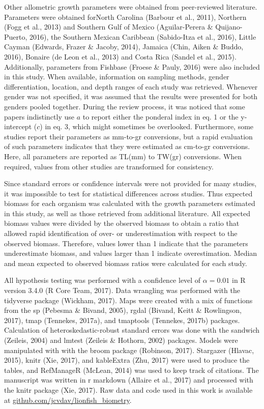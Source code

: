\documentclass[12pt,]{article}
\begin{document}
Other allometric growth parameters were obtained from peer-reviewed
literature. Parameters were obtained forNorth Carolina (Barbour et al.,
2011), Northern (Fogg et al., 2013) and Southern Gulf of Mexico
(Aguilar-Perera \& Quijano-Puerto, 2016), the Southern Mexican Caribbean
(Sabido-Itza et al., 2016), Little Cayman (Edwards, Frazer \& Jacoby,
2014), Jamaica (Chin, Aiken \& Buddo, 2016), Bonaire (de Leon et al.,
2013) and Costa Rica (Sandel et al., 2015). Additionally, parameters
from Fishbase (Froese \& Pauly, 2016) were also included in this study.
When available, information on sampling methods, gender differentiation,
location, and depth ranges of each study was retrieved. Whenever gender
was not specified, it was assumed that the results were presented for
both genders pooled together. During the review process, it was noticed
that some papers indistinctly use \(a\) to report either the ponderal
index in eq. 1 or the y-intercept (\(c\)) in eq. 3, which might
sometimes be overlooked. Furthermore, some studies report their
parameters as mm-to-gr conversions, but a rapid evaluation of such
parameters indicates that they were estimated as cm-to-gr conversions.
Here, all parameters are reported as TL(mm) to TW(gr) conversions. When
required, values from other studies are transformed for consistency.

Since standard errors or confidence intervals were not provided for many
studies, it was impossible to test for statistical differences across
studies. Thus expected biomass for each organism was calculated with the
growth parameters estimated in this study, as well as those retrieved
from additional literature. All expected biomass values were divided by
the observed biomass to obtain a ratio that allowed rapid identification
of over- or underestimation with respect to the observed biomass.
Therefore, values lower than 1 indicate that the parameters
underestimate biomass, and values larger than 1 indicate overestimation.
Median and mean expected to observed biomass ratios were calculated for
each study.

All hypothesis testing was performed with a confidence level of
\(\alpha = 0.01\) in R version 3.4.0 (R Core Team, 2017). Data wrangling
was performed with the tidyverse package (Wickham, 2017). Maps were
created with a mix of functions from the sp (Pebesma \& Bivand, 2005),
rgdal (Bivand, Keitt \& Rowlingson, 2017), tmap (Tennekes, 2017a), and
tmaptools (Tennekes, 2017b) packages. Calculation of
heteroskedastic-robust standard errors was done with the sandwich
(Zeileis, 2004) and lmtest (Zeileis \& Hothorn, 2002) packages. Models
were manipulated with with the broom package (Robinson, 2017). Stargazer
(Hlavac, 2015), knitr (Xie, 2017), and kableExtra (Zhu, 2017) were used
to produce the tables, and RefManageR (McLean, 2014) was used to keep
track of citations. The manuscript was written in r markdown (Allaire et
al., 2017) and processed with the knitr package (Xie, 2017). Raw data
and code used in this work is available at
\url{github.com/jcvdav/lionfish_biometry}.
\end{document}
